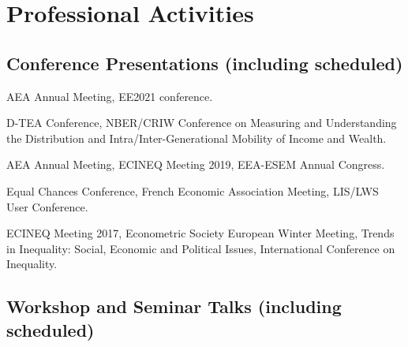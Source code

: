 \documentclass[10pt]{article}
\begin{document}
\section*{Professional Activities}

\subsection*{Conference Presentations (including scheduled)}

\begin{description}[font=\mdseries]
\item[2021]
  AEA Annual Meeting, EE2021 conference.
\item[2020]
	D-TEA Conference,
	NBER/CRIW Conference on Measuring and Understanding the Distribution and Intra/Inter-Generational Mobility of Income and Wealth.
\item[2019]
  AEA Annual Meeting,
  ECINEQ Meeting 2019,
  EEA-ESEM Annual Congress.
\item[2018]
  Equal Chances Conference,
  French Economic Association Meeting,
  LIS/LWS User Conference.
\item[2017]
  ECINEQ Meeting 2017,
  Econometric Society European Winter Meeting,
  Trends in Inequality: Social, Economic and Political Issues, International Conference on Inequality.
\end{description}

\subsection*{Workshop and Seminar Talks (including scheduled)}
\end{document}
